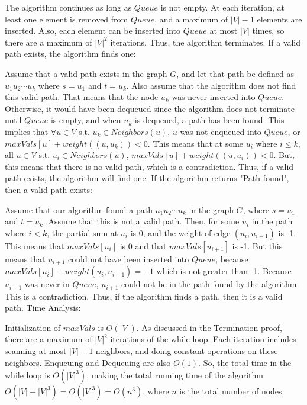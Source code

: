 \documentclass[11pt]{article}
\begin{document}
The algorithm continues as long as $Queue$ is not empty. At each iteration, at least one element is removed from $Queue$, and a maximum of $|V| - 1$ elements are inserted. Also, each element can be inserted into $Queue$ at most $|V|$ times, so there are a maximum of $|V|^{2}$ iterations. Thus, the algorithm terminates. \newline \newline
If a valid path exists, the algorithm finds one: \newline

Assume that a valid path exists in the graph $G$, and let that path be defined as $u_{1}u_{2} \dotsb u_{k}$ where $s = u_{1}$ and $t = u_{k}$. Also assume that the algorithm does not find this valid path. That means that the node $u_{k}$ was never inserted into $Queue$. Otherwise, it would have been dequeued since the algorithm does not terminate until $Queue$ is empty, and when $u_{k}$ is dequeued, a path has been found. This implies that $ \forall u \in V$ s.t. $u_{k} \in Neighbors(u)$, $ u $ was not enqueued into $Queue$, or $ maxVals[u] + weight((u, u_{k})) < 0$. This means that at some $u_{i}$ where $i \leq k$, all $u \in V$ s.t. $u_{i} \in Neighbors(u)$, $ maxVals[u] + weight((u, u_{i})) < 0 $. But, this means that there is no valid path, which is a contradiction. Thus, if a valid path exists, the algorithm will find one. \newline \newline
If the algorithm returns "Path found", then a valid path exists: \newline

Assume that our algorithm found a path $u_{1}u_{2} \dotsb u_{k}$ in the graph $G$, where $s = u_{1}$ and $t = u_{k}$. Assume that this is not a valid path. Then, for some $u_{i}$ in the path where $i < k$, the partial sum at $u_{i}$ is 0, and the weight of edge $(u_{i}, u_{i+1})$ is -1. This means that $maxVals[u_{i}]$ is 0 and that $maxVals[u_{i+1}]$ is -1. But this means that $u_{i+1}$ could not have been inserted into $Queue$, because $maxVals[u_{i}] + weight(u_{i}, u_{i+1}) = -1$ which is not greater than -1. Because $u_{i+1}$ was never in $Queue$, $u_{i+1}$ could not be in the path found by the algorithm. This is a contradiction. Thus, if the algorithm finds a path, then it is a valid path. \newline \newline
Time Analysis: \newline

Initialization of $maxVals$ is $O(|V|)$. As discussed in the Termination proof, there are a maximum of $|V|^{2}$ iterations of the while loop. Each iteration includes scanning at most $|V|-1$ neighbors, and doing constant operations on these neighbors. Enqueuing and Dequeuing are also $O(1)$. So, the total time in the while loop is $O(|V|^{3})$, making the total running time of the algorithm $O(|V| + |V|^{3}) = O(|V|^{3}) = O(n^{3})$, where $n$ is the total number of nodes.
\end{document}

